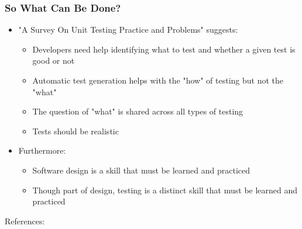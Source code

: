 \documentclass{beamer}
\begin{document}
\begin{frame}
\frametitle{So What Can Be Done?}
\begin{itemize}
\item "A Survey On Unit Testing Practice and Problems"\cite{unitTestSurv} suggests:
\begin{itemize}
	\item Developers need help identifying what to test and whether a given test is good or not
	\item Automatic  test generation helps with the "how" of testing but not the "what"
	\item The question of "what" is shared across all types of testing
	\item Tests should be realistic
\end{itemize}
\item Furthermore:
\begin{itemize}
	\item Software design is a skill that must be learned and practiced 
	\item Though part of design, testing is a distinct skill that must be learned and practiced
\end{itemize}
\end{itemize}
\end{frame}
References:

	\nocite{*}
	
	
\end{document}
